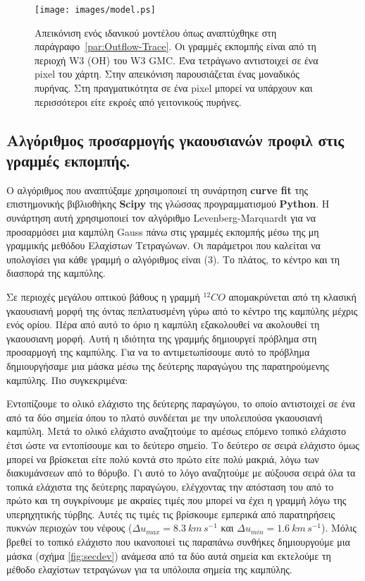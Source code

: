 \documentclass[a4paper,12pt]{memoir}
\begin{document}
\begin{figure}[H]
	\centering
	\texttt{[image: images/model.ps]}
	\caption{Απεικόνιση ενός ιδανικού μοντέλου όπως αναπτύχθηκε στη παράγραφο~\ref{par:Outflow-Trace}. Οι γραμμές εκπομπής είναι από τη περιοχή W3 (OH) του W3 GMC. Ένα τετράγωνο αντιστοιχεί σε ένα pixel του χάρτη. Στην απεικόνιση παρουσιάζεται ένας μοναδικός πυρήνας. Στη πραγματικότητα σε ένα pixel μπορεί να υπάρχουν και περισσότεροι είτε εκροές από γειτονικούς πυρήνες.}
\end{figure}


\subsection{Αλγόριθμος προσαρμογής γκαουσιανών προφιλ στις γραμμές εκπομπής.}
\label{par:gauss}
Ο αλγόριθμος που αναπτύξαμε χρησιμοποιεί τη συνάρτηση \textbf{curve fit} της επιστημονικής βιβλιοθήκης \textbf{Scipy} της γλώσσας προγραμματισμού \textbf{Python}. Η συνάρτηση αυτή χρησιμοποιεί τον αλγόριθμο Levenberg-Marquardt για να προσαρμόσει μια καμπύλη Gauss πάνω στις γραμμές εκπομπής μέσω της μη γραμμικής μεθόδου Ελαχίστων Τετραγώνων. Οι παράμετροι που καλείται να υπολογίσει για κάθε γραμμή ο αλγόριθμος είναι (3). Το πλάτος, το κέντρο και τη διασπορά της καμπύλης.

Σε περιοχές μεγάλου οπτικού βάθους η γραμμή $^{12}CO$ απομακρύνεται από τη κλασική γκαουσιανή μορφή της όντας πεπλατυσμένη γύρω από το κέντρο της καμπύλης μέχρις ενός ορίου. Πέρα από αυτό το όριο η καμπύλη εξακολουθεί να ακολουθεί τη γκαουσιανη μορφή. Αυτή η ιδιότητα της γραμμής δημιουργεί πρόβλημα στη προσαρμογή της καμπύλης. Για να το αντιμετωπίσουμε αυτό το πρόβλημα δημιουργήσαμε μια μάσκα μέσω της δεύτερης παραγώγου της παρατηρούμενης καμπύλης. Πιο συγκεκριμένα:

Εντοπίζουμε το ολικό ελάχιστο της δεύτερης παραγώγου, το οποίο αντιστοιχεί σε ένα από τα δύο σημεία όπου το πλατό συνδέεται με την υπολειπούσα γκαουσιανή καμπύλη. Μετά το ολικό ελάχιστο αναζητούμε το αμέσως επόμενο τοπικό ελάχιστο έτσι ώστε να εντοπίσουμε και το δεύτερο σημείο. 
Το δεύτερο σε σειρά ελάχιστο όμως μπορεί να βρίσκεται είτε πολύ κοντά στο πρώτο είτε πολύ μακριά, λόγω των διακυμάνσεων από το θόρυβο. 
Γι αυτό το λόγο αναζητούμε με αύξουσα σειρά όλα τα τοπικά ελάχιστα της δεύτερης παραγώγου, ελέγχοντας την απόσταση του από το πρώτο και τη συγκρίνουμε με ακραίες τιμές που μπορεί να έχει η γραμμή λόγω της υπερηχητικής τύρβης. Αυτές τις τιμές τις βρίσκουμε εμπερικά από παρατηρήσεις πυκνών περιοχών του νέφους ($\Delta u _{max}=8.3 \ km\, s^{-1}$ και $\Delta u _{min} =1.6 \ km\, s^{-1}$). 
Μόλις βρεθεί το τοπικό ελάχιστο που ικανοποιεί τις παραπάνω συνθήκες δημιουργούμε μια μάσκα (σχήμα \ref{fig:secdev}) ανάμεσα από τα δύο αυτά σημεία και εκτελούμε τη μέθοδο ελαχίστων τετραγώνων για τα υπόλοιπα σημεία της καμπύλης.
\end{document}
